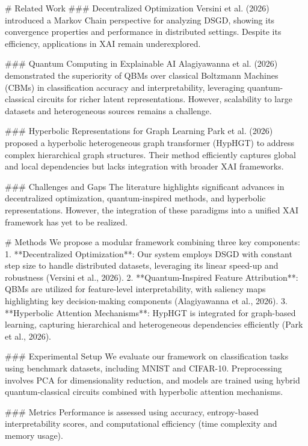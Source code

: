 # Related Work  
### Decentralized Optimization  
Versini et al. (2026) introduced a Markov Chain perspective for analyzing DSGD, showing its convergence properties and performance in distributed settings. Despite its efficiency, applications in XAI remain underexplored.  

### Quantum Computing in Explainable AI  
Alagiyawanna et al. (2026) demonstrated the superiority of QBMs over classical Boltzmann Machines (CBMs) in classification accuracy and interpretability, leveraging quantum-classical circuits for richer latent representations. However, scalability to large datasets and heterogeneous sources remains a challenge.  

### Hyperbolic Representations for Graph Learning  
Park et al. (2026) proposed a hyperbolic heterogeneous graph transformer (HypHGT) to address complex hierarchical graph structures. Their method efficiently captures global and local dependencies but lacks integration with broader XAI frameworks.  

### Challenges and Gaps  
The literature highlights significant advances in decentralized optimization, quantum-inspired methods, and hyperbolic representations. However, the integration of these paradigms into a unified XAI framework has yet to be realized.  

# Methods  
We propose a modular framework combining three key components:  
1. **Decentralized Optimization**: Our system employs DSGD with constant step size to handle distributed datasets, leveraging its linear speed-up and robustness (Versini et al., 2026).  
2. **Quantum-Inspired Feature Attribution**: QBMs are utilized for feature-level interpretability, with saliency maps highlighting key decision-making components (Alagiyawanna et al., 2026).  
3. **Hyperbolic Attention Mechanisms**: HypHGT is integrated for graph-based learning, capturing hierarchical and heterogeneous dependencies efficiently (Park et al., 2026).  

### Experimental Setup  
We evaluate our framework on classification tasks using benchmark datasets, including MNIST and CIFAR-10. Preprocessing involves PCA for dimensionality reduction, and models are trained using hybrid quantum-classical circuits combined with hyperbolic attention mechanisms.  

### Metrics  
Performance is assessed using accuracy, entropy-based interpretability scores, and computational efficiency (time complexity and memory usage).  

